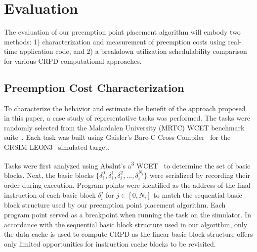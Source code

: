 \vspace{-10pt}
\section{Evaluation}\label{sec:evaluation}
The evaluation of our preemption point placement algorithm will embody
two methods: 1) characterization and measurement of preemption costs
using real-time application code, and 2) a breakdown utilization schedulability
comparison for various CRPD computational approaches.
\subsection {Preemption Cost
  Characterization}\label{sec:preemption_cost_measurement}
To characterize the behavior and estimate the benefit of the approach
proposed in this paper, a case study of representative tasks was
performed. The tasks were randomly selected from the Malardalen University (MRTC) WCET benchmark suite~\cite{mrtc:01}. Each task was built using Gaisler's Bare-C Cross Compiler~\cite{gaisler:01} for the GRSIM LEON3~\cite{gaisler:02} simulated target.
%

Tasks were first analyzed using AbsInt's a\textsuperscript{3} WCET~\cite{absint:01}
to determine the set of basic blocks. Next, the basic blocks ${\{\delta_i^0, \delta_i^1, \delta_i^2, ..., \delta_i^{N_i}\}}$ were serialized by recording their order during execution. Program points were identified as the address of the final instruction of each basic block ${\delta_i^j}$ for $j \in [0, N_i]$ to match the sequential basic block structure used by our preemption point placement algorithm. Each program point served as a breakpoint when running the task on the simulator. In accordance with the sequential basic block structure used in our algorithm, only the data cache is used to compute CRPD as the linear basic block structure offers only limited opportunities for instruction cache blocks to be revisited.

